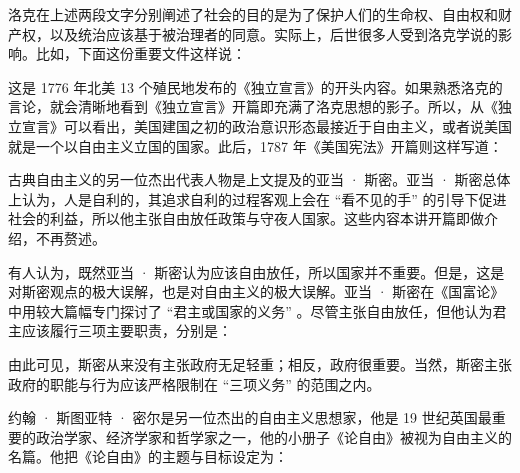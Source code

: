 洛克在上述两段文字分别阐述了社会的目的是为了保护人们的生命权、自由权和财产权，以及统治应该基于被治理者的同意。实际上，后世很多人受到洛克学说的影响。比如，下面这份重要文件这样说：


这是 1776 年北美 13 个殖民地发布的《独立宣言》的开头内容。如果熟悉洛克的言论，就会清晰地看到《独立宣言》开篇即充满了洛克思想的影子。所以，从《独立宣言》可以看出，美国建国之初的政治意识形态最接近于自由主义，或者说美国就是一个以自由主义立国的国家。此后，1787 年《美国宪法》开篇则这样写道：


古典自由主义的另一位杰出代表人物是上文提及的亚当 · 斯密。亚当 · 斯密总体上认为，人是自利的，其追求自利的过程客观上会在 “看不见的手” 的引导下促进社会的利益，所以他主张自由放任政策与守夜人国家。这些内容本讲开篇即做介绍，不再赘述。

有人认为，既然亚当 · 斯密认为应该自由放任，所以国家并不重要。但是，这是对斯密观点的极大误解，也是对自由主义的极大误解。亚当 · 斯密在《国富论》中用较大篇幅专门探讨了 “君主或国家的义务” 。尽管主张自由放任，但他认为君主应该履行三项主要职责，分别是：


由此可见，斯密从来没有主张政府无足轻重；相反，政府很重要。当然，斯密主张政府的职能与行为应该严格限制在 “三项义务” 的范围之内。

约翰 · 斯图亚特 · 密尔是另一位杰出的自由主义思想家，他是 19 世纪英国最重要的政治学家、经济学家和哲学家之一，他的小册子《论自由》被视为自由主义的名篇。他把《论自由》的主题与目标设定为：


